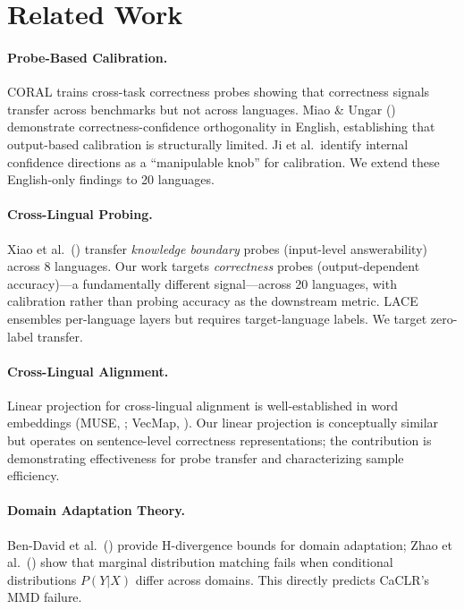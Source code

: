 \documentclass[11pt,a4paper]{article}
\begin{document}
\section{Related Work}

\paragraph{Probe-Based Calibration.}
CORAL \cite{miao2026coral} trains cross-task correctness probes showing that correctness signals transfer across benchmarks but not across languages.
Miao \& Ungar (\citeyear{miao2026steering}) demonstrate correctness-confidence orthogonality in English, establishing that output-based calibration is structurally limited.
Ji et al.\ identify internal confidence directions as a ``manipulable knob'' for calibration.
We extend these English-only findings to 20 languages.

\paragraph{Cross-Lingual Probing.}
Xiao et al.\ (\citeyear{xiao2025}) transfer \emph{knowledge boundary} probes (input-level answerability) across 8 languages.
Our work targets \emph{correctness} probes (output-dependent accuracy)---a fundamentally different signal---across 20 languages, with calibration rather than probing accuracy as the downstream metric.
LACE \cite{zhou2024lace} ensembles per-language layers but requires target-language labels.
We target zero-label transfer.

\paragraph{Cross-Lingual Alignment.}
Linear projection for cross-lingual alignment is well-established in word embeddings (MUSE, \citealp{conneau2018muse}; VecMap, \citealp{artetxe2018vecmap}).
Our linear projection is conceptually similar but operates on sentence-level correctness representations; the contribution is demonstrating effectiveness for probe transfer and characterizing sample efficiency.

\paragraph{Domain Adaptation Theory.}
Ben-David et al.\ (\citeyear{bendavid2010}) provide H-divergence bounds for domain adaptation; Zhao et al.\ (\citeyear{zhao2019}) show that marginal distribution matching fails when conditional distributions $P(Y|X)$ differ across domains.
This directly predicts CaCLR's MMD failure.
\end{document}
